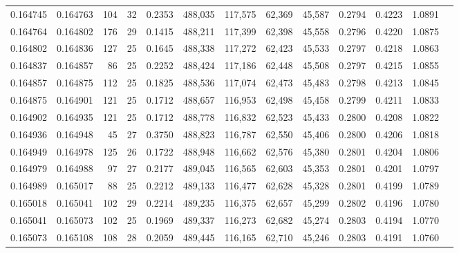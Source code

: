 \begin{tabular}{rrrrrrrrrrrrr}
0.164745 & 0.164763 & 104 &  32 &                                     0.2353 & 488,035 & 117,575 &  62,369 &  45,587 & 0.2794 & 0.4223 & 1.0891 \\
0.164764 & 0.164802 & 176 &  29 &                                     0.1415 & 488,211 & 117,399 &  62,398 &  45,558 & 0.2796 & 0.4220 & 1.0875 \\
0.164802 & 0.164836 & 127 &  25 &                                     0.1645 & 488,338 & 117,272 &  62,423 &  45,533 & 0.2797 & 0.4218 & 1.0863 \\
0.164837 & 0.164857 &  86 &  25 &                                     0.2252 & 488,424 & 117,186 &  62,448 &  45,508 & 0.2797 & 0.4215 & 1.0855 \\
0.164857 & 0.164875 & 112 &  25 &                                     0.1825 & 488,536 & 117,074 &  62,473 &  45,483 & 0.2798 & 0.4213 & 1.0845 \\
0.164875 & 0.164901 & 121 &  25 &                                     0.1712 & 488,657 & 116,953 &  62,498 &  45,458 & 0.2799 & 0.4211 & 1.0833 \\
0.164902 & 0.164935 & 121 &  25 &                                     0.1712 & 488,778 & 116,832 &  62,523 &  45,433 & 0.2800 & 0.4208 & 1.0822 \\
0.164936 & 0.164948 &  45 &  27 &                                     0.3750 & 488,823 & 116,787 &  62,550 &  45,406 & 0.2800 & 0.4206 & 1.0818 \\
0.164949 & 0.164978 & 125 &  26 &                                     0.1722 & 488,948 & 116,662 &  62,576 &  45,380 & 0.2801 & 0.4204 & 1.0806 \\
0.164979 & 0.164988 &  97 &  27 &                                     0.2177 & 489,045 & 116,565 &  62,603 &  45,353 & 0.2801 & 0.4201 & 1.0797 \\
0.164989 & 0.165017 &  88 &  25 &                                     0.2212 & 489,133 & 116,477 &  62,628 &  45,328 & 0.2801 & 0.4199 & 1.0789 \\
0.165018 & 0.165041 & 102 &  29 &                                     0.2214 & 489,235 & 116,375 &  62,657 &  45,299 & 0.2802 & 0.4196 & 1.0780 \\
0.165041 & 0.165073 & 102 &  25 &                                     0.1969 & 489,337 & 116,273 &  62,682 &  45,274 & 0.2803 & 0.4194 & 1.0770 \\
0.165073 & 0.165108 & 108 &  28 &                                     0.2059 & 489,445 & 116,165 &  62,710 &  45,246 & 0.2803 & 0.4191 & 1.0760 \\

\end{tabular}
